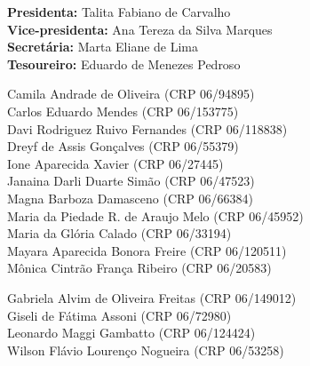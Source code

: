 
\begin{CreditoInstitucional}
    \textbf{Presidenta:} Talita Fabiano de Carvalho\\
    \textbf{Vice-presidenta:} Ana Tereza da Silva Marques\\
    \textbf{Secretária:} Marta Eliane de Lima\\
    \textbf{Tesoureiro:} Eduardo de Menezes Pedroso\\
\end{CreditoInstitucional}


\begin{CreditoInstitucional}
    Camila Andrade de Oliveira (CRP 06/94895)\\
    Carlos Eduardo Mendes (CRP 06/153775)\\
    Davi Rodriguez Ruivo Fernandes (CRP 06/118838)\\
    Dreyf de Assis Gonçalves (CRP 06/55379)\\
    Ione Aparecida Xavier (CRP 06/27445)\\
    Janaina Darli Duarte Simão (CRP 06/47523)\\
    Magna Barboza Damasceno (CRP 06/66384)\\
    Maria da Piedade R. de Araujo Melo (CRP 06/45952)\\
    Maria da Glória Calado (CRP 06/33194)\\
    Mayara Aparecida Bonora Freire (CRP 06/120511)\\
    Mônica Cintrão França Ribeiro (CRP 06/20583)\\
\end{CreditoInstitucional}

\begin{CreditoInstitucional}
    Gabriela Alvim de Oliveira Freitas (CRP 06/149012)\\
    Giseli de Fátima Assoni (CRP 06/72980)\\
    Leonardo Maggi Gambatto (CRP 06/124424)\\
    Wilson Flávio Lourenço Nogueira (CRP 06/53258)\\
\end{CreditoInstitucional}

